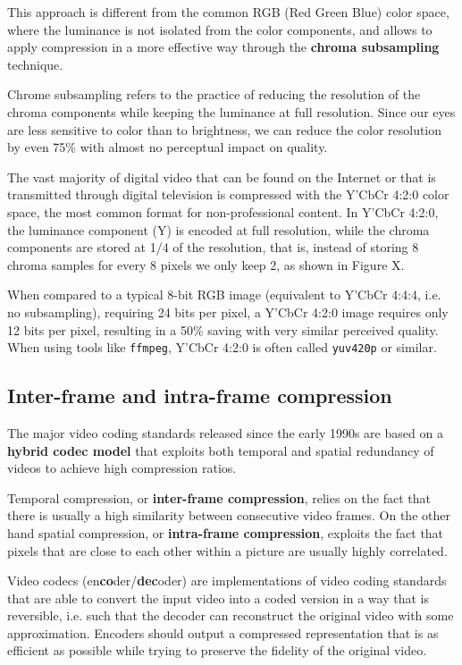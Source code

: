 This approach is different from the common RGB (Red Green Blue) color space, where the luminance is not isolated from the color components, and allows to apply compression in a more effective way through the \textbf{chroma subsampling} technique.

Chrome subsampling refers to the practice of reducing the resolution of the chroma components while keeping the luminance at full resolution. Since our eyes are less sensitive to color than to brightness, we can reduce the color resolution by even 75\% with almost no perceptual impact on quality.


The vast majority of digital video that can be found on the Internet or that is transmitted through digital television is compressed with the Y'CbCr 4:2:0 color space, the most common format for non-professional content. In Y'CbCr 4:2:0, the luminance component (Y) is encoded at full resolution, while the chroma components are stored at 1/4 of the resolution, that is, instead of storing 8 chroma samples for every 8 pixels we only keep 2, as shown in Figure X.


When compared to a typical 8-bit RGB image (equivalent to Y'CbCr 4:4:4, i.e. no subsampling), requiring 24 bits per pixel, a Y'CbCr 4:2:0 image requires only 12 bits per pixel, resulting in a 50\% saving with very similar perceived quality. When using tools like \texttt{ffmpeg}, Y'CbCr 4:2:0 is often called \texttt{yuv420p} or similar.

\subsection{Inter-frame and intra-frame compression}
\label{sec:bg/compression/intra-inter}

The major video coding standards released since the early 1990s are based on a \textbf{hybrid codec model} that exploits both temporal and spatial redundancy of videos to achieve high compression ratios.

Temporal compression, or \textbf{inter-frame compression}, relies on the fact that there is usually a high similarity between consecutive video frames. On the other hand spatial compression, or \textbf{intra-frame compression}, exploits the fact that pixels that are close to each other within a picture are usually highly correlated.

Video codecs (en\textbf{co}der/\textbf{dec}oder) are implementations of video coding standards that are able to convert the input video into a coded version in a way that is reversible, i.e. such that the decoder can reconstruct the original video with some approximation. Encoders should output a compressed representation that is as efficient as possible while trying to preserve the fidelity of the original video.

